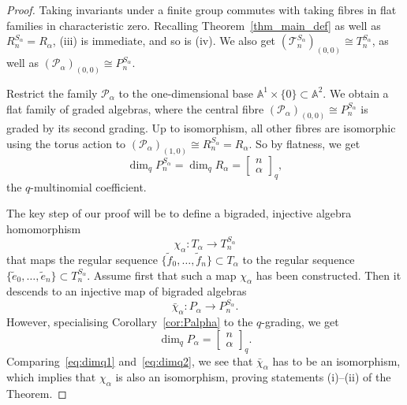 \documentclass[a4paper,11pt]{amsart}
\theoremstyle{plain}
\theoremstyle{definition}
\newcommand{\A}{\mathbb{A}}
\newcommand{\CP}{\mathscr{P}}
\newcommand{\CT}{\mathcal{T}} %
\newcommand{\tf}{\widetilde{f}}
\begin{document}
\begin{proof} Taking invariants under a finite group commutes with taking fibres in flat families in characteristic zero. Recalling Theorem~\ref{thm_main_def} as well as $R_n^{S_\alpha}=R_\alpha$, 
(iii) is immediate, and so is (iv). We also get 
$(\CT_n^{S_\alpha})_{(0,0)}\cong T_n^{S_\alpha}$, as well as $(\CP_\alpha)_{(0,0)}\cong P_n^{S_\alpha}$. 

Restrict the family $\CP_\alpha$ to the one-dimensional base $\A^1\times\{0\}\subset\A^2$. 
We obtain a flat family of graded algebras, where the central fibre $(\CP_\alpha)_{(0,0)}\cong P_n^{S_\alpha}$ is graded by its second grading. Up to isomorphism, all other fibres are isomorphic using the torus action to $(\CP_\alpha)_{(1,0)}\cong R_n^{S_\alpha} = R_\alpha$. So by flatness, we get 
\begin{equation}\label{eq:dimq1} \dim_q P_n^{S_\alpha} = \dim_q R_\alpha = \left[\begin{array}{c}n\\\alpha\end{array}\right]_q,
\end{equation}
the $q$-multinomial coefficient. 

The key step of our proof will be to define a bigraded, injective algebra homomorphism 
\[ \chi_\alpha \colon T_\alpha\to T_n^{S_\alpha}\]
that maps the regular sequence $\{\tf_0, \ldots, \tf_n\}\subset T_\alpha$ to the regular sequence 
$\{\tilde e_0, \ldots, \tilde e_n\}\subset T_n^{S_\alpha}$. Assume first that such a map $\chi_\alpha$ has been constructed. Then it descends to an injective map of 
bigraded algebras
\[ \bar\chi_\alpha \colon P_\alpha\to P_n^{S_\alpha}.\]
However, specialising Corollary~\ref{cor:Palpha} to the $q$-grading, we get
\begin{equation}\label{eq:dimq2}
    \dim_q P_\alpha = \left[\begin{array}{c}n\\\alpha\end{array}\right]_q. 
\end{equation} 
Comparing~\eqref{eq:dimq1} and~\eqref{eq:dimq2}, we see that $\bar\chi_\alpha$ has to be
an isomorphism, which implies that $\chi_\alpha$ is also an isomorphism, proving statements (i)--(ii) of the Theorem. 


\end{proof}
\end{document}
